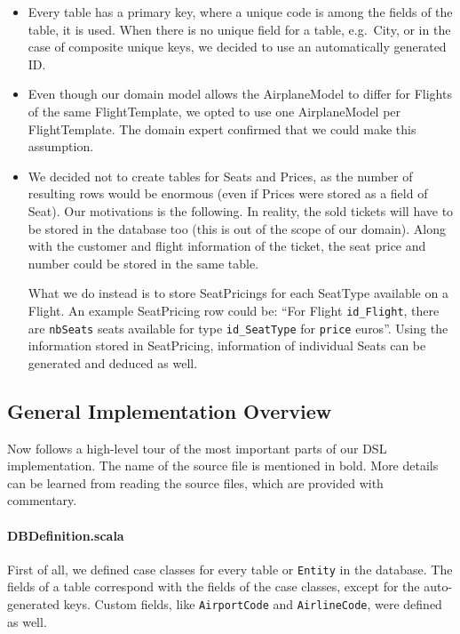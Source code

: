 \documentclass[a4paper]{article}
\newcommand{\cc}[1]{\texttt{#1}}
\begin{document}
\begin{itemize}
\item Every table has a primary key, where a unique code is among the fields of the table, it is used.
  When there is no unique field for a table, e.g.\ City, or in the case of composite unique keys, we decided to use an automatically generated ID.
\item Even though our domain model allows the AirplaneModel to differ for Flights of the same FlightTemplate, we opted to use one AirplaneModel per FlightTemplate.
  The domain expert confirmed that we could make this assumption. %
\item We decided not to create tables for Seats and Prices, as the number of resulting rows would be enormous (even if Prices were stored as a field of Seat).
  Our motivations is the following.
  In reality, the sold tickets will have to be stored in the database too (this is out of the scope of our domain).
  Along with the customer and flight information of the ticket, the seat price and number could be stored in the same table.

  What we do instead is to store SeatPricings for each SeatType available on a Flight.
  An example SeatPricing row could be: ``For Flight \cc{id\_Flight}, there are \cc{nbSeats} seats available for type \cc{id\_SeatType} for \cc{price} euros''.
  Using the information stored in SeatPricing, information of individual Seats can be generated and deduced as well.
\end{itemize}



\subsection{General Implementation Overview}
\label{sec:general-implementation-overview}

Now follows a high-level tour of the most important parts of our DSL implementation.
The name of the source file is mentioned in bold.
More details can be learned from reading the source files, which are provided with commentary.

\paragraph{DBDefinition.scala}
First of all, we defined case classes for every table or \cc{Entity} in the database.
The fields of a table correspond with the fields of the case classes, except for the auto-generated keys.
Custom fields, like \cc{Airport\-Code} and \cc{Air\-line\-Code}, were defined as well.
\end{document}
